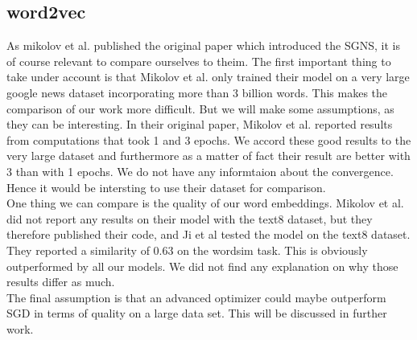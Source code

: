 \subsection{word2vec}

As mikolov et al. published the original paper which introduced the SGNS, it is of course relevant to compare ourselves to theim. The first important thing to take under account is that Mikolov et al. only trained their model on a very large google news dataset incorporating more than 3 billion words. This makes the comparison of our work more difficult. But we will make some assumptions, as they can be interesting. 
In their original paper, Mikolov et al. reported results from computations that took 1 and 3 epochs. We accord these good results to the very large dataset  and furthermore as a matter of fact their result are better with 3 than with 1 epochs. We do not have any informtaion about the convergence. Hence it would be intersting to use their dataset for comparison. \\
One thing we can compare is the quality of our word embeddings. Mikolov et al. did not report any results on their model with the text8 dataset, but they therefore published their code, and Ji et al \cite{intel} tested the model on the text8 dataset. They reported a similarity of 0.63 on the wordsim task. This is obviously outperformed by all our models. We did not find any explanation on why those results differ as much. \\
The final assumption is that an advanced optimizer could maybe outperform SGD in terms of quality on a large data set. This will be discussed in further work.
 


